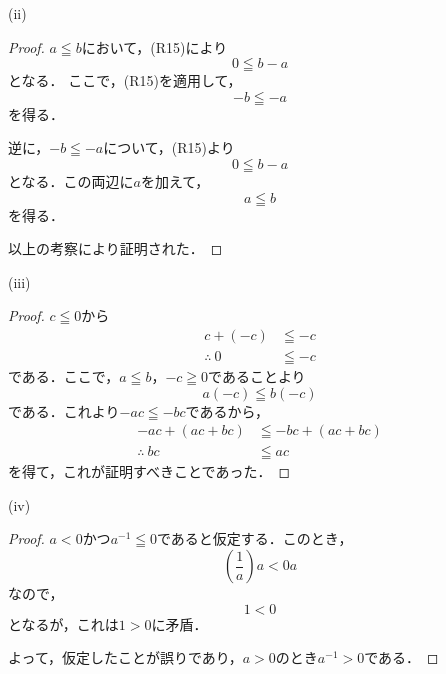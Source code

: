 \documentclass[a4paper,10pt,fleqn]{ltjsarticle}
\begin{document}
    \begin{itembox}[c]{(ii)}
        \begin{proof}
            $a \leqq b$において，(R15)により
            \[
                0 \leqq b-a
            \]
            となる．
            ここで，(R15)を適用して，
            \[
                -b \leqq -a
            \]
            を得る．

            逆に，$-b\leqq -a$について，(R15)より
            \[
                0 \leqq b -a
            \]
            となる．この両辺に$a$を加えて，
            \[
                a \leqq b 
            \]
            を得る．

            以上の考察により証明された．
        \end{proof}
        \end{itembox}

    \newpage 

    \begin{itembox}[c]{(iii)}
        \begin{proof}
            $c \leqq 0$から
            \begin{align*} 
                 c+(-c) &\leqq -c \\
                \therefore ~ 0 &\leqq -c 
            \end{align*} 
            である．ここで，$a \leqq b$，$-c \geqq 0$であることより
            \[
                a(-c) \leqq b (-c)
            \]
            である．これより$ -ac \leqq -bc$であるから，
            \begin{align*} 
                -ac + (ac+bc) &\leqq -bc +(ac+bc) \\
                \therefore ~ bc &\leqq ac 
            \end{align*} 
            を得て，これが証明すべきことであった．
        \end{proof}
    \end{itembox}

    \begin{itembox}[c]{(iv)}
        \begin{proof}
            $a<0$かつ$a^{-1} \leqq 0$であると仮定する．このとき，
            \[
               \left ( \frac{1}{a} \right) a < 0a
            \]
            なので，
            \[
                1<0
            \]
            となるが，これは$1>0$に矛盾．

            よって，仮定したことが誤りであり，$a>0$のとき$a^{-1} >0$である．
            \end{proof}
        \end{itembox}
\end{document}
